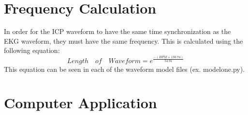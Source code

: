 \documentclass[12pt]{report}
\begin{document}
\section*{Frequency Calculation}
In order for the ICP waveform to have the same time synchronization as the EKG waveform, they must have the same frequency. This is calculated using the following equation: 
$$Length \quad  of \quad  Waveform = e^{\frac{-(BPM + 193.74)}{54.91}}$$
\newline
This equation can be seen in each of the waveform model files (ex. modelone.py). 
\section*{Computer Application}
\end{document}
